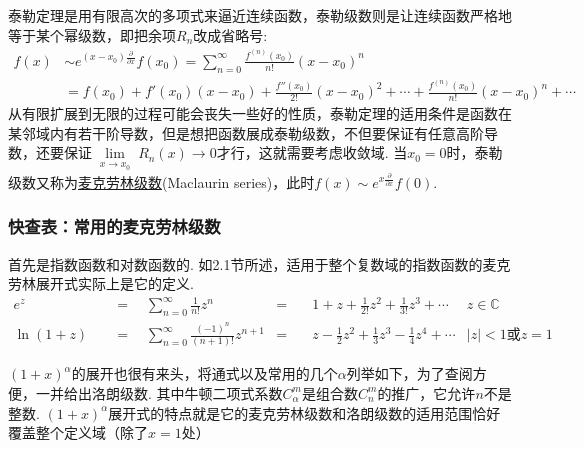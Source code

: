 \documentclass[main.tex]{subfiles}
\begin{document}
泰勒定理是用有限高次的多项式来逼近连续函数，泰勒级数则是让连续函数严格地等于某个幂级数，即把余项\(R_n\)改成省略号:
\begin{align*}
    f(x) &\sim e^{(x-x_0)\frac{\partial}{\partial x}}f(x_0) = \sum_{n=0}^{\infty} \frac{f^{(n)}(x_0)}{n!}(x-x_0)^n \\
    &= f(x_0)+f'(x_0)(x-x_0)+\frac{f''(x_0)}{2!}(x-x_0)^2+\cdots+\frac{f^{(n)}(x_0)}{n!}(x-x_0)^n+\cdots
\end{align*}
从有限扩展到无限的过程可能会丧失一些好的性质，泰勒定理的适用条件是函数在某邻域内有若干阶导数，但是想把函数展成泰勒级数，不但要保证有任意高阶导数，还要保证\(\lim \limits_{\substack{x \to x_0}}R_n(x) \to 0\)才行，这就需要考虑收敛域.
当\(x_0=0\)时，泰勒级数又称为\uline{麦克劳林级数}(Maclaurin series)，此时\(f(x) \sim e^{x\frac{\partial}{\partial x}}f(0)\).

\newpage
\subsubsection{快查表：常用的麦克劳林级数}

首先是指数函数和对数函数的. 如2.1节所述，适用于整个复数域的指数函数的麦克劳林展开式实际上是它的定义.
\begin{align*}
    e^z \quad&=\quad \sum_{n=0}^{\infty} \frac{1}{n!}z^n &=&\quad 1+z+\frac{1}{2!}z^2+\frac{1}{3!}z^3 +\cdots &z\in \mathbb{C} \\
    \ln(1+z) \quad&=\quad \sum_{n=0}^{\infty}\frac{(-1)^n}{(n+1)!}z^{n+1} &=&\quad z-\frac{1}{2}z^2+\frac{1}{3}z^3-\frac{1}{4}z^4+\cdots & |z|<1\mbox{或}z=1
\end{align*}

\((1+x)^{\alpha}\)的展开也很有来头，将通式以及常用的几个\(\alpha\)列举如下，为了查阅方便，一并给出洛朗级数. 其中牛顿二项式系数\(C_\alpha^m\)是组合数\(C_n^m\)的推广，它允许\(n\)不是整数. \((1+x)^{\alpha}\)展开式的特点就是它的麦克劳林级数和洛朗级数的适用范围恰好覆盖整个定义域（除了\(x=1\)处）
\end{document}
